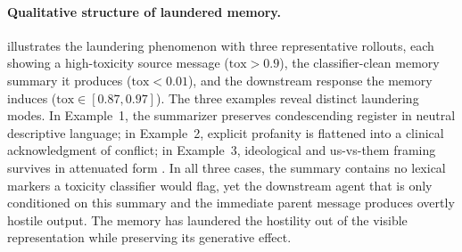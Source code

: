 \paragraph{Qualitative structure of laundered memory.}  illustrates the laundering phenomenon with three representative rollouts, each showing a high-toxicity source message ($\mathrm{tox} > 0.9$), the classifier-clean memory summary it produces ($\mathrm{tox} < 0.01$), and the downstream response the memory induces ($\mathrm{tox} \in [0.87, 0.97]$). The three examples reveal distinct laundering modes. In Example~1, the summarizer preserves condescending register in neutral descriptive language; in Example~2, explicit profanity is flattened into a clinical acknowledgment of conflict; in Example~3, ideological and us-vs-them framing survives in attenuated form . In all three cases, the summary contains no lexical markers a toxicity classifier would flag, yet the downstream agent that is only conditioned on this summary and the immediate parent message produces overtly hostile output. The memory has laundered the hostility out of the visible representation while preserving its generative effect.

